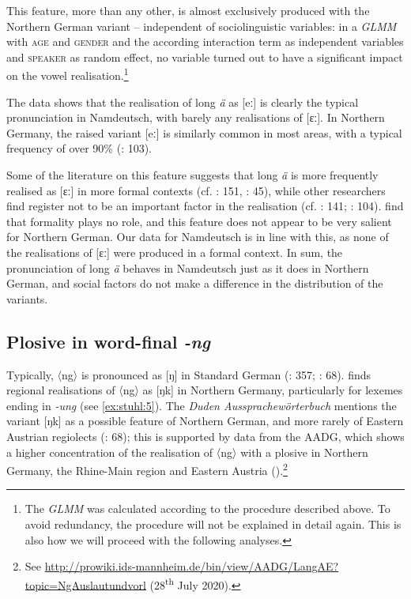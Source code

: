 \documentclass[output=paper]{langsci/langscibook}
\begin{document}
This feature, more than any other, is almost exclusively produced with the Northern German variant -- independent of sociolinguistic variables: in a \textit{GLMM} with \textsc{age} and \textsc{gender} and the according interaction term as independent variables and \textsc{speaker} as random effect, no variable turned out to have a significant impact on the vowel realisation.\footnote{The \textit{GLMM} was calculated according to the procedure described above. To avoid redundancy, the procedure will not be explained in detail again. This is also how we will proceed with the following analyses.} 

The data shows that the realisation of long \textit{ä} as [eː] is clearly the typical pronunciation in Namdeutsch, with barely any realisations of [ɛː]. In Northern Germany, the raised variant [eː] is similarly common in most areas, with a typical frequency of over 90\% (\citealt{elmentaler_norddeutscher_2015}: 103). 

Some of the literature on this feature suggests that long \textit{ä} is more frequently realised as [ɛː] in more formal contexts (cf. \citealt{stearns_contemporary_1979}: 151, \citealt{konig_atlas_2019a}: 45), while other researchers find register not to be an important factor in the realisation (cf. \citealt{herrmann-winter_studien_1979}: 141; \citealt{elmentaler_norddeutscher_2015}: 104). \citet[106]{elmentaler_norddeutscher_2015} find that formality plays no role, and this feature does not appear to be very salient for Northern German. Our data for Namdeutsch is in line with this, as none of the realisations of [ɛː] were produced in a formal context. In sum, the pronunciation of long \textit{ä} behaves in Namdeutsch just as it does in Northern German, and social factors do not make a difference in the distribution of the variants.

\subsection{Plosive in word-final \textit{-ng}}
\label{sec:stuhl:4.3}

Typically, 〈ng〉 is pronounced as [ŋ] in Standard German (\citealt{elmentaler_norddeutscher_2015}: 357; \citealt{kleiner_duden_2015}: 68). \citet[233]{konig_atlas_2019b} finds regional realisations of 〈ng〉 as [ŋk] in Northern Germany, particularly for lexemes ending in \textit{-ung} (see \ref{ex:stuhl:5}). The \textit{Duden Aussprachewörterbuch} mentions the variant [ŋk] as a possible feature of Northern German, and more rarely of Eastern Austrian regiolects (\citealt{kleiner_duden_2015}: 68); this is supported by data from the AADG, which shows a higher concentration of the realisation of 〈ng〉 with a plosive in Northern Germany, the Rhine-Main region and Eastern Austria (\citealt{kleiner_atlas_2011}).\footnote{See \url{http://prowiki.ids-mannheim.de/bin/view/AADG/LangAE?topic=NgAuslautundvorl} (28\textsuperscript{th} July 2020).}
\end{document}
